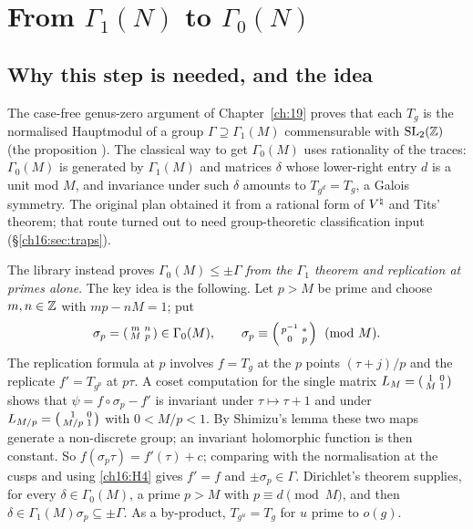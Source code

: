 \section{From \texorpdfstring{$\Gamma_1(N)$}{Gamma1(N)} to \texorpdfstring{$\Gamma_0(N)$}{Gamma0(N)}}\label{ch16:sec:gammazero}

\subsection{Why this step is needed, and the idea}

The case-free genus-zero argument of Chapter~\ref{ch:19} proves that each $T_g$ is the normalised Hauptmodul of a group
$\Gamma\supseteq\Gamma_1(M)$ commensurable with $\mathrm{SL}_2(\mathbb{Z})$ (the proposition ).  The
classical way to get $\Gamma_0(M)$ uses rationality of the traces: $\Gamma_0(M)$ is generated by $\Gamma_1(M)$ and
matrices $\delta$ whose lower-right entry $d$ is a unit mod $M$, and invariance under such $\delta$ amounts to
$T_{g^d}=T_g$, a Galois symmetry.  The original plan obtained it from
a rational form of ${V^{\natural}}$ and Tits' theorem; that route turned out to need group-theoretic classification input
(\S\ref{ch16:sec:traps}).

The library instead proves $\Gamma_0(M)\le\pm\Gamma$ \emph{from the $\Gamma_1$ theorem and replication at primes
alone}.  The key idea is the following.  Let $p>M$ be prime and choose
$m,n\in{\mathbb{Z}}$ with $mp-nM=1$; put
\begin{equation*}
  \sigma_p=\left(\begin{smallmatrix}m&n\\M&p\end{smallmatrix}\right)\in\Gamma_0(M),\qquad \sigma_p\equiv\left(\begin{smallmatrix}p^{-1}&*\\0&p\end{smallmatrix}\right)\pmod M .
\end{equation*}
The replication formula at $p$ involves $f=T_g$ at the $p$ points $(\tau+j)/p$ and the replicate $f'=T_{g^p}$ at
$p\tau$.  A coset computation for the single matrix $L_M=\left(\begin{smallmatrix}1&0\\M&1\end{smallmatrix}\right)$ shows that $\psi=f\circ\sigma_p-f'$ is
invariant under $\tau\mapsto\tau+1$ and under $L_{M/p}=\left(\begin{smallmatrix}1&0\\M/p&1\end{smallmatrix}\right)$ with $0<M/p<1$.  By Shimizu's lemma these
two maps generate a non-discrete group; an invariant holomorphic function is then constant.  So
$f(\sigma_p\tau)=f'(\tau)+c$; comparing with the normalisation at the cusps and using \ref{ch16:H4} gives $f'=f$ and
$\pm\sigma_p\in\Gamma$.  Dirichlet's theorem supplies, for every $\delta\in\Gamma_0(M)$, a prime $p>M$ with
$p\equiv d\pmod M$, and then $\delta\in\Gamma_1(M)\sigma_p\subseteq\pm\Gamma$.  As a by-product, $T_{g^u}=T_g$ for $u$
prime to $o(g)$.


